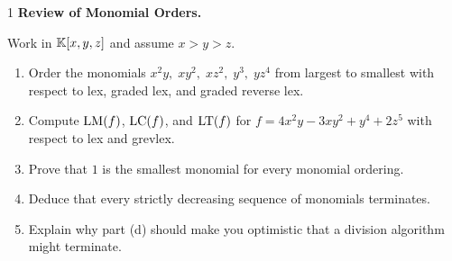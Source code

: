 \documentclass[Notebook.tex]{subfiles}
\begin{document}
\newpage

\begin{problem}{1} \textbf{Review of Monomial Orders.} 
    
    Work in $\mathbb K[x,y,z]$ and assume $x>y>z$.
    \begin{enumerate}[label=(\alph*),ref=\theenumi\alph*]
        \item Order the monomials $x^2y,\; xy^2,\; xz^2,\; y^3,\; yz^4$ from largest to smallest with respect to lex, graded lex, and graded reverse lex. 

        \item Compute $\text{LM}(f)$, $\text{LC}(f)$, and $\text{LT}(f)$ for $f=4x^2y-3xy^2+y^4+2z^5$ with respect to lex and grevlex. 

        \item Prove that $1$ is the smallest monomial for every monomial ordering.
        
        \item Deduce that every strictly decreasing sequence of monomials terminates.
        
        \item Explain why part (d) should make you optimistic that a division algorithm might terminate.
    \end{enumerate}
\end{problem}
\end{document}
